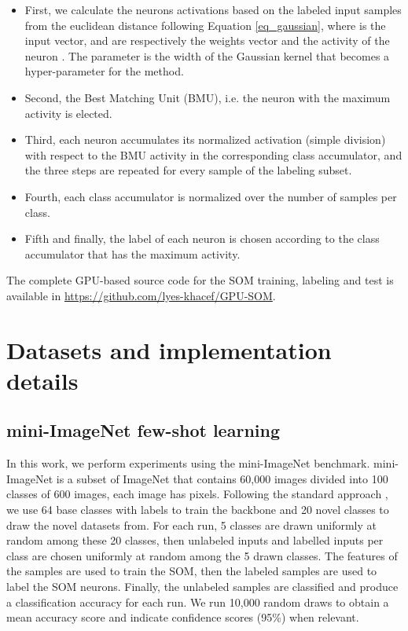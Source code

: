 \documentclass[runningheads]{llncs}
\begin{document}
\begin{itemize}
    \item First, we calculate the neurons activations based on the labeled input samples from the euclidean distance following Equation \ref{eq_gaussian}, where  is the input vector,  and  are respectively the weights vector and the activity of the neuron . The parameter  is the width of the Gaussian kernel that becomes a hyper-parameter for the method.
    
    \item Second, the Best Matching Unit (BMU), i.e. the neuron with the maximum activity is elected.
    
    \item Third, each neuron accumulates its normalized activation (simple division) with respect to the BMU activity in the corresponding class accumulator, and the three steps are repeated for every sample of the labeling subset.

    \item Fourth, each class accumulator is normalized over the number of samples per class.

    \item Fifth and finally, the label of each neuron is chosen according to the class accumulator that has the maximum activity.
\end{itemize}

The complete GPU-based source code for the SOM training, labeling and test is available in \url{https://github.com/lyes-khacef/GPU-SOM}.



\section{Datasets and implementation details}
\label{sec_methods}
\subsection{mini-ImageNet few-shot learning}

In this work, we perform experiments using the mini-ImageNet \cite{vinyals2016imgnet} benchmark. mini-ImageNet is a subset of ImageNet \cite{russakovsky2015imgnet} that contains 60,000 images divided into 100 classes of 600 images, each image has  pixels. Following the standard approach \cite{ravi2017optimization_few_shot}, we use 64 base classes with labels to train the backbone and 20 novel classes to draw the novel datasets from. For each run, 5 classes are drawn uniformly at random among these 20 classes, then  unlabeled inputs and  labelled inputs per class are chosen uniformly at random among the 5 drawn classes. The features of the  samples are used to train the SOM, then the  labeled samples are used to label the SOM neurons. Finally, the  unlabeled samples are classified and produce a classification accuracy for each run. We run 10,000 random draws to obtain a mean accuracy score and indicate confidence scores (95\%) when relevant.
\end{document}

